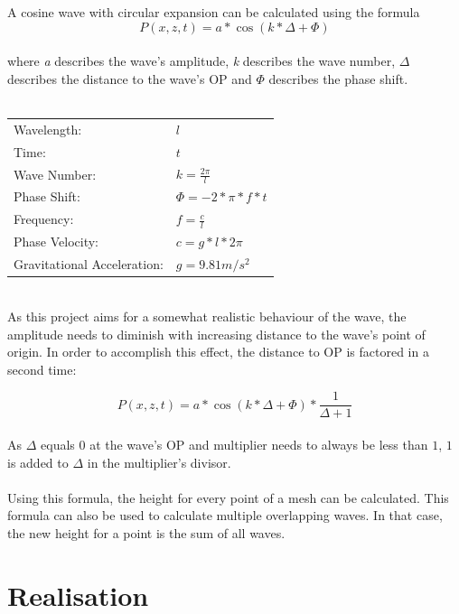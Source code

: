 \documentclass[12pt,a4paper]{scrartcl}
\begin{document}
A cosine wave with circular expansion can be calculated using the formula
$$P(x,z,t) = a * \cos(k * {\Delta} + \Phi) $$
\ \\
where \textit{a} describes the wave's amplitude, \textit{k} describes the wave number, ${\Delta}$ describes the distance to the wave's OP and $\Phi$ describes the phase shift.\\
\ \\
\begin{center}
	\begin{tabular}{ll}
		Wavelength: & $l$ \\
		Time: & $t$ \\
		Wave Number: & $k = \frac{2\pi}{l}$ \\
		Phase Shift: & $\Phi = -2 * \pi * f * t$ \\
		Frequency: & $f = \frac{c}{l}$ \\
		Phase Velocity: & $c = g * l * 2\pi$ \\
		Gravitational Acceleration: & $g = 9.81 m/s^2$
	\end{tabular}
\end{center}
\ \\
As this project aims for a somewhat realistic behaviour of the wave, the amplitude needs to diminish with increasing distance to the wave's point of origin. In order to accomplish this effect, the distance to OP is factored in a second time:

$$P(x,z,t) = a * \cos(k * {\Delta} + \Phi) * \frac{1}{{\Delta}+1} $$
\ \\
As ${\Delta}$ equals $0$ at the wave's OP and multiplier needs to always be less than $1$, $1$ is added to ${\Delta}$ in the multiplier's divisor.\\
\ \\
Using this formula, the height for every point of a mesh can be calculated. This formula can also be used to calculate multiple overlapping waves. In that case, the new height for a point is the sum of all waves.\\

\section{Realisation}
\end{document}
